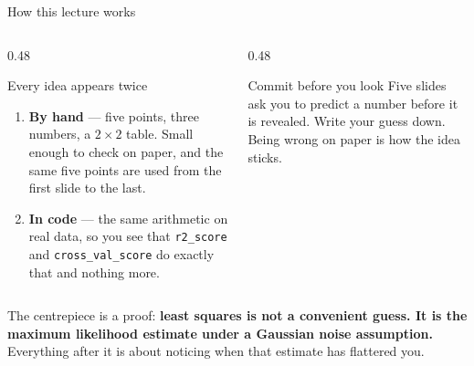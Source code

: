 \documentclass[aspectratio=169]{beamer}
\begin{document}
\begin{frame}[shrink=6]{How this lecture works}
  \begin{columns}[T]
    \begin{column}{0.48\textwidth}
      \begin{block}{Every idea appears twice}
        \begin{enumerate}
          \item \textbf{By hand} --- five points, three numbers, a
            $2\times2$ table. Small enough to check on paper, and the same
            five points are used from the first slide to the last.
          \item \textbf{In code} --- the same arithmetic on real data, so you
            see that \texttt{r2\_score} and \texttt{cross\_val\_score} do
            exactly that and nothing more.
        \end{enumerate}
      \end{block}
    \end{column}
    \begin{column}{0.48\textwidth}
      \begin{alertblock}{Commit before you look}
        Five slides ask you to predict a number before it is revealed. Write
        your guess down. Being wrong on paper is how the idea sticks.
      \end{alertblock}
    \end{column}
  \end{columns}
  \vspace{0.4em}
  \begin{center}
    \small The centrepiece is a proof: \textbf{least squares is not a
    convenient guess. It is the maximum likelihood estimate under a Gaussian
    noise assumption.} Everything after it is about noticing when that
    estimate has flattered you.
  \end{center}
\end{frame}
\end{document}
